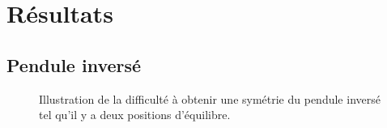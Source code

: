 \documentclass[a4paper,12pt,oneside]{article}
\begin{document}
\section{Résultats}

\subsection{Pendule inversé}

\begin{figure}[!ht]
    \hfill
    \caption{Illustration de la difficulté à obtenir une symétrie du pendule inversé tel qu'il y a deux positions d'équilibre.}
    \label{fig:equilibre}
\end{figure}
\end{document}
